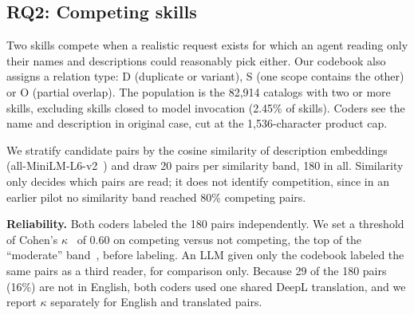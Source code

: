 \subsection{RQ2: Competing skills}

Two skills compete when a realistic request exists for which an agent reading only their names and descriptions could reasonably pick either. Our codebook also assigns a relation type: D (duplicate or variant), S (one scope contains the other) or O (partial overlap). The population is the 82,914 catalogs with two or more skills, excluding skills closed to model invocation (2.45\% of skills). Coders see the name and description in original case, cut at the 1,536-character product cap.

We stratify candidate pairs by the cosine similarity of description embeddings (all-MiniLM-L6-v2~\cite{reimers2019sbert}) and draw 20 pairs per similarity band, 180 in all. Similarity only decides which pairs are read; it does not identify competition, since in an earlier pilot no similarity band reached 80\% competing pairs.

\textbf{Reliability.} Both coders labeled the 180 pairs independently. We set a threshold of Cohen's $\kappa$~\cite{cohen1960kappa} of 0.60 on competing versus not competing, the top of the ``moderate'' band~\cite{landis1977kappa}, before labeling. An LLM given only the codebook labeled the same pairs as a third reader, for comparison only. Because 29 of the 180 pairs (16\%) are not in English, both coders used one shared DeepL translation, and we report $\kappa$ separately for English and translated pairs.

